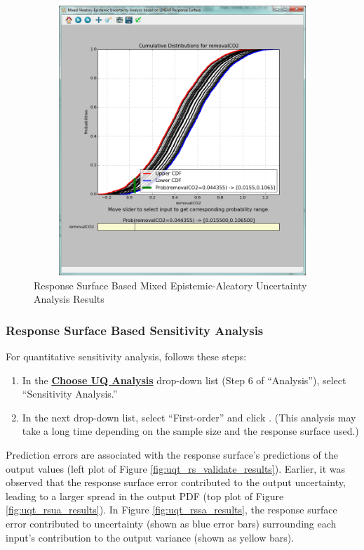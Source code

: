 \begin{figure}[H]
\centering \includegraphics[width=6.5in,height=4in,keepaspectratio]{Chapt_uq/figs/tutorial/24b_RSAEUAResults}
\caption{Response Surface Based Mixed Epistemic-Aleatory Uncertainty Analysis Results}
\label{fig:uqt_rsaeua_results}
\end{figure}

\subsubsection{Response Surface Based Sensitivity Analysis}

For quantitative sensitivity analysis, follows these steps:
\begin{enumerate}
\item{In the \textbf{\underline{Choose UQ Analysis}} drop-down list (Step 6 of ``Analysis''), select ``Sensitivity Analysis.''}
\item{In the next drop-down list, select ``First-order'' and click . (This analysis may
take a long time depending on the sample size and the response surface used.)}
\end{enumerate}
Prediction errors are associated with the response surface's predictions of the output values (left plot of Figure \ref{fig:uqt_rs_validate_results}). Earlier, it was observed that the response surface error contributed to the output uncertainty, leading to a larger spread in the output PDF (top plot of Figure \ref{fig:uqt_rsua_results}). In Figure \ref{fig:uqt_rssa_results}, the response surface error contributed to uncertainty (shown as blue error bars) surrounding each input's contribution to the output variance (shown as yellow bars).


